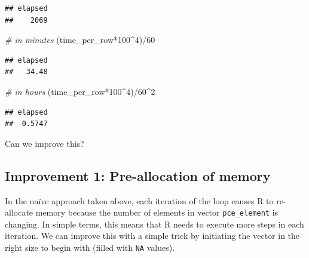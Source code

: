 \documentclass[
  12pt,
]{style/krantz}
\newenvironment{Shaded}{\begin{snugshade}}{\end{snugshade}}
\newcommand{\CommentTok}[1]{\textcolor[rgb]{0.56,0.35,0.01}{\textit{#1}}}
\newcommand{\DecValTok}[1]{\textcolor[rgb]{0.00,0.00,0.81}{#1}}
\newcommand{\NormalTok}[1]{#1}
\newcommand{\SpecialCharTok}[1]{\textcolor[rgb]{0.00,0.00,0.00}{#1}}
\begin{document}
\begin{verbatim}
## elapsed 
##    2069
\end{verbatim}

\begin{Shaded}
\begin{Highlighting}[]
\CommentTok{\# in minutes}
\NormalTok{(time\_per\_row}\SpecialCharTok{*}\DecValTok{100}\SpecialCharTok{\^{}}\DecValTok{4}\NormalTok{)}\SpecialCharTok{/}\DecValTok{60} 
\end{Highlighting}
\end{Shaded}

\begin{verbatim}
## elapsed 
##   34.48
\end{verbatim}

\begin{Shaded}
\begin{Highlighting}[]
\CommentTok{\# in hours}
\NormalTok{(time\_per\_row}\SpecialCharTok{*}\DecValTok{100}\SpecialCharTok{\^{}}\DecValTok{4}\NormalTok{)}\SpecialCharTok{/}\DecValTok{60}\SpecialCharTok{\^{}}\DecValTok{2} 
\end{Highlighting}
\end{Shaded}

\begin{verbatim}
## elapsed 
##  0.5747
\end{verbatim}

Can we improve this?

\hypertarget{improvement-1-pre-allocation-of-memory}{%
\subsection{Improvement 1: Pre-allocation of memory}\label{improvement-1-pre-allocation-of-memory}}

In the naïve approach taken above, each iteration of the loop causes R to re-allocate memory because the number of elements in vector \texttt{pce\_element} is changing. In simple terms, this means that R needs to execute more steps in each iteration. We can improve this with a simple trick by initiating the vector in the right size to begin with (filled with \texttt{NA} values).
\end{document}
